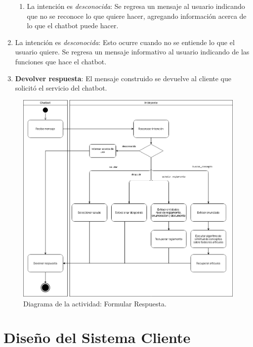 \begin{enumerate}
\begin{enumerate}
        \item La intención es \textit{desconocida}: Se regresa un mensaje al usuario indicando que no se reconoce lo que quiere hacer, agregando información acerca de lo que el chatbot puede hacer.
    \end{enumerate}
    
    \item La intención es \textit{desconocida}: Esto ocurre cuando no se entiende lo que el usuario quiere. Se regresa un mensaje informativo al usuario indicando de las funciones que hace el chatbot.
    
    \item \textbf{Devolver respuesta}: El mensaje construido se devuelve al cliente que solicitó el servicio del chatbot.
\end{enumerate}

\newpage

\begin{figure}[ht]
    \centering
    \includegraphics[scale=0.49]{images/5/diagrama-actividades}
    \caption{Diagrama de la actividad: Formular Respuesta.}
    \label{fig:actividad-responder}
\end{figure}


%
%
%
%

\newpage

\section{Diseño del Sistema Cliente}

